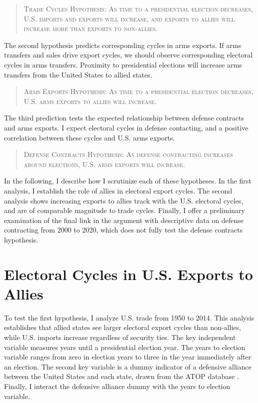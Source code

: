 \documentclass[12pt]{article}
\begin{document}
\begin{quote}
\textsc{Trade Cycles Hypothesis: As time to a presidential election decreases, U.S. imports and exports will increase, and exports to allies will increase more than exports to non-allies.}
\end{quote}



The second hypothesis predicts corresponding cycles in arms exports.
If arms transfers and sales drive export cycles, we should observe corresponding electoral cycles in arms transfers.
Proximity to presidential elections will increase arms transfers from the United States to allied states. 


\begin{quote}
\textsc{Arms Exports Hypothesis: As time to a presidential election decreases, U.S. arms exports to allies will increase.}
\end{quote}


The third prediction tests the expected relationship between defense contracts and arms exports. 
I expect electoral cycles in defense contacting, and a positive correlation between these cycles and U.S. arms exports.


\begin{quote}
\textsc{Defense Contracts Hypothesis: As defense contracting increases around elections, U.S. arms exports will increase.}
\end{quote}


In the following, I describe how I scrutinize each of these hypotheses. 
In the first analysis, I establish the role of allies in electoral export cycles. 
The second analysis shows increasing exports to allies track with the U.S. electoral cycles, and are of comparable magnitude to trade cycles.
Finally, I offer a preliminary examination of the final link in the argument with descriptive data on defense contracting from 2000 to 2020, which does not fully test the defense contracts hypothesis.




\section{Electoral Cycles in U.S. Exports to Allies}

To test the first hypothesis, I analyze U.S. trade from 1950 to 2014. 
This analysis establishes that allied states see larger electoral export cycles than non-allies, while U.S. imports increase regardless of security ties. 
The key independent variable measures years until a presidential election year.
The years to election variable ranges from zero in election years to three in the year immediately after an election. 
The second key variable is a dummy indicator of a defensive alliance between the United States and each state, drawn from the ATOP database \citep{Leedsetal2002}.
Finally, I interact the defensive alliance dummy with the years to election variable.
\end{document}
